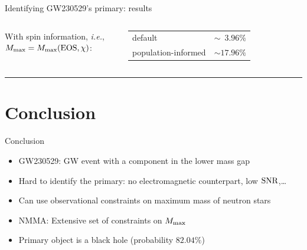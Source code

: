 \documentclass[usenames,dvipsnames,t]{beamer}
\begin{document}
\begin{frame}{Identifying GW230529's primary: results}
\begin{minipage}[t][\heightnmma]{\textwidth}
\begin{columns}
        With spin information, \textit{i.e.}, $M_{\rm{max}} = M_{\rm{max}}(\rm{EOS}, \chi)$:

        \vspace{2mm}

        \begin{table}
          \centering
          \begin{tabular}{| p{\mycolwidth} | p{\mycolwidthh} |}
            \hline
            default & $\sim \phantom{0}3.96 \%$ \\
            population-informed & $\sim 17.96 \%$ \\
            \hline
          \end{tabular}
        \end{table}
      \end{columns}
      \end{minipage}

      \hrule


  
\end{frame}

\section{Conclusion}

\begin{frame}{Conclusion}

  \def\x{7mm}

  \begin{itemize}
    \item GW230529: GW event with a component in the lower mass gap

    \vspace{\x}

    \item Hard to identify the primary: no electromagnetic counterpart, low $\rm{SNR}$,\dots

    \vspace{\x}

    \item Can use observational constraints on maximum mass of neutron stars

    \vspace{\x}

    \item \textsc{NMMA}: Extensive set of constraints on $M_{\rm{max}}$

    \vspace{\x}

    \item Primary object is a black hole (probability $82.04 \%$)
  \end{itemize}
  
\end{frame}
\end{document}
